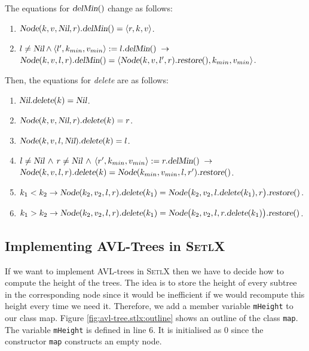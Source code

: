 The equations for  $\textsl{delMin}()$ change as follows:
\begin{enumerate}
\item $\textsl{Node}(k, v, \textsl{Nil}, r).\textsl{delMin}() = \langle r, k, v \rangle$.
\item $l\not= \textsl{Nil} \wedge \langle l',k_{min}, v_{min}\rangle := l.\textsl{delMin}() 
       \;\rightarrow$ \\[0.2cm]
       \hspace*{1.3cm} 
       $\textsl{Node}(k, v, l, r).\textsl{delMin}() = 
        \langle \textsl{Node}(k, v, l', r).\textsl{restore}(), k_{min}, v_{min} \rangle$.
\end{enumerate}
Then, the equations for \textsl{delete} are as follows:
\begin{enumerate}
\item $\textsl{Nil}.\textsl{delete}(k) = \textsl{Nil}$.
\item $\textsl{Node}(k,v,\textsl{Nil},r).\textsl{delete}(k) = r$.
\item $\textsl{Node}(k,v,l,\textsl{Nil}).\textsl{delete}(k) = l$.
\item $l \not= \textsl{Nil} \,\wedge\, r \not= \textsl{Nil} \,\wedge\, 
       \langle r',k_{min}, v_{min} \rangle := r.\textsl{delMin}()  \;\rightarrow$ \\[0.2cm]
      \hspace*{1.3cm}
      $\textsl{Node}(k,v,l,r).\textsl{delete}(k) = \textsl{Node}(k_{min},v_{min},l,r').\textsl{restore}()$.
\item $k_1 < k_2 \rightarrow \textsl{Node}(k_2,v_2,l,r).\textsl{delete}(k_1) = 
       \textsl{Node}\bigl(k_2,v_2,l.\textsl{delete}(k_1),r\bigr).\textsl{restore}()$.
\item $k_1 > k_2 \rightarrow \textsl{Node}(k_2,v_2,l,r).\textsl{delete}(k_1) = 
         \textsl{Node}\bigl(k_2,v_2,l,r.\textsl{delete}(k_1)\bigr).\textsl{restore}()$.
\end{enumerate}


\subsection{Implementing AVL-Trees in \textsc{SetlX}}
If we want to implement AVL-trees in \textsc{SetlX} then we have to decide how to compute the height
of the trees.  The idea is to store the height of every subtree in the corresponding node since it
would be inefficient if we would recompute this height every time we need it.  Therefore, we add a
member variable \texttt{mHeight} to our class map.
Figure \ref{fig:avl-tree.stlx:outline} shows an outline of the class \texttt{map}.  The variable
\texttt{mHeight} is defined in line 6.  It is initialised as $0$ since the constructor \texttt{map}
constructs an empty node.  

